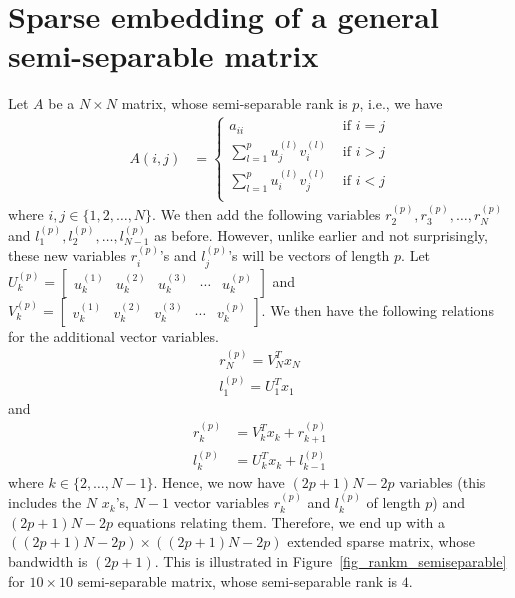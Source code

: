 \documentclass[final,leqno]{siamltex}
\begin{document}
\section{Sparse embedding of a general semi-separable matrix}
Let $A$ be a $N \times N$ matrix, whose semi-separable rank is $p$, i.e., we have
\begin{align}
A(i,j) & =
\begin{cases}
a_{ii} & \text{ if }i=j\\
\displaystyle\sum_{l=1}^p u_j^{(l)} v_i^{(l)} & \text{ if }i>j\\
\displaystyle\sum_{l=1}^p u_i^{(l)} v_j^{(l)} & \text{ if }i<j\\
\end{cases}
\end{align}
where $i,j \in \{1,2,\ldots,N\}$. We then add the following variables $r_2^{(p)},r_3^{(p)},\ldots,r_N^{(p)}$ and $l_1^{(p)},l_2^{(p)},\ldots,l_{N-1}^{(p)}$ as before. However, unlike earlier and not surprisingly, these new variables $r_i^{(p)}$'s and $l_j^{(p)}$'s will be vectors of length $p$. Let $U_k^{(p)} = \begin{bmatrix} u_k^{(1)} & u_k^{(2)} & u_k^{(3)} & \cdots & u_k^{(p)}\end{bmatrix}$ and $V_k^{(p)} = \begin{bmatrix} v_k^{(1)} & v_k^{(2)} & v_k^{(3)} & \cdots & v_k^{(p)}\end{bmatrix}$. We then have the following relations for the additional vector variables.
\begin{align}
r_N^{(p)} = V_N^Tx_N\\
l_1^{(p)} = U_1^Tx_1
\end{align} and
\begin{align}
r_k^{(p)} & = V_k^T x_k + r_{k+1}^{(p)}\\
l_k^{(p)} & = U_k^T x_k + l_{k-1}^{(p)}
\end{align}
where $k \in \{2,\ldots,N-1\}$. Hence, we now have $(2p+1)N-2p$ variables (this includes the $N$ $x_k$'s, $N-1$ vector variables $r_k^{(p)}$ and $l_k^{(p)}$ of length $p$) and $(2p+1)N-2p$ equations relating them. Therefore, we end up with a $((2p+1)N-2p) \times ((2p+1)N-2p)$ extended sparse matrix, whose bandwidth is $(2p+1)$. This is illustrated in Figure~\ref{fig_rankm_semiseparable} for $10 \times 10$ semi-separable matrix, whose semi-separable rank is $4$.
\end{document}

